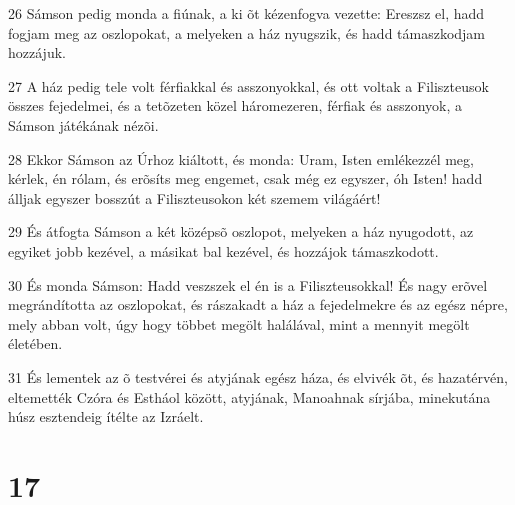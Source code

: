 \par 26 Sámson pedig monda a fiúnak, a ki õt kézenfogva vezette: Ereszsz el, hadd fogjam meg az oszlopokat, a melyeken a ház nyugszik, és hadd támaszkodjam hozzájuk.
\par 27 A ház pedig tele volt férfiakkal és asszonyokkal, és ott voltak a Filiszteusok összes fejedelmei, és a tetõzeten közel háromezeren, férfiak és asszonyok, a Sámson játékának nézõi.
\par 28 Ekkor Sámson az Úrhoz kiáltott, és monda: Uram, Isten emlékezzél meg, kérlek, én rólam, és erõsíts meg engemet, csak még ez egyszer, óh Isten! hadd álljak egyszer bosszút a Filiszteusokon két szemem világáért!
\par 29 És átfogta Sámson a két középsõ oszlopot, melyeken a ház nyugodott, az egyiket jobb kezével, a másikat bal kezével, és hozzájok támaszkodott.
\par 30 És monda Sámson: Hadd veszszek el én is a Filiszteusokkal! És nagy erõvel megrándította az oszlopokat, és rászakadt a ház a fejedelmekre és az egész népre, mely abban volt, úgy hogy többet megölt halálával, mint a mennyit megölt életében.
\par 31 És lementek az õ testvérei és atyjának egész háza, és elvivék õt, és hazatérvén, eltemették Czóra és Estháol között, atyjának, Manoahnak sírjába, minekutána húsz esztendeig ítélte az Izráelt.

\chapter{17}

